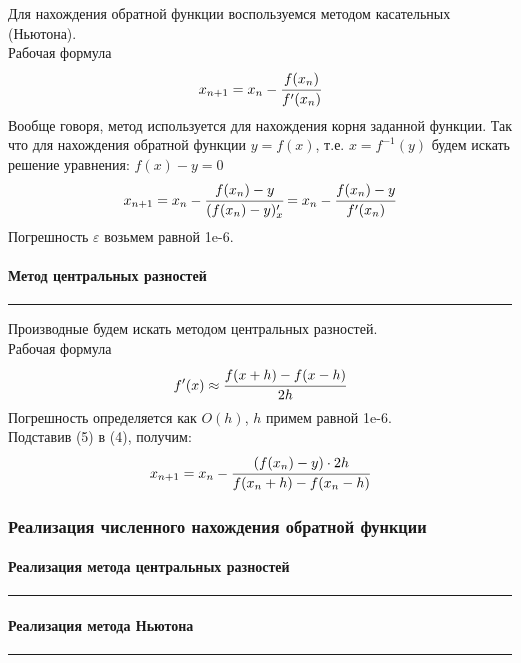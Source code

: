 \documentclass[a4paper, 14pt]{extarticle}
\begin{document}
Для нахождения обратной функции воспользуемся методом касательных (Ньютона). \\
Рабочая формула
\begin{equation*}
  x_{n+1} = x_n - \cfrac{f(x_n)}{f'(x_n)}
\end{equation*}
Вообще говоря, метод используется для нахождения корня заданной функции. Так что 
для нахождения обратной функции $y = f(x)$, т.е. $x = f^{-1}(y)$ будем искать 
решение уравнения: $f(x) - y = 0$
\begin{equation}
  x_{n+1} = x_n - \cfrac{f(x_n) - y}{(f(x_n) - y)'_x} = 
  x_n - \cfrac{f(x_n) - y}{f'(x_n)}
\end{equation}
Погрешность $\varepsilon$ возьмем равной 1e-6.

\paragraph{Метод центральных разностей}\vspace{-20pt}\rule{\linewidth}{0.1mm}

Производные будем искать методом центральных разностей.\\
Рабочая формула
\begin{equation}
  f'(x) \approx \cfrac{f(x+h) - f(x-h)}{2h}
\end{equation}
Погрешность определяется как $O(h)$, $h$ примем равной 1e-6.\\

Подставив (5) в (4), получим:
\begin{equation}
  x_{n+1} = x_n - \cfrac{(f(x_n) - y) \cdot 2 h}{f(x_n + h) - f(x_n - h)}
\end{equation}

\subsubsection{Реализация численного нахождения обратной функции}

\paragraph{Реализация метода центральных разностей}\vspace{-20pt}\rule{\linewidth}{0.1mm}



\paragraph{Реализация метода Ньютона}\vspace{-20pt}\rule{\linewidth}{0.1mm}
\end{document}
